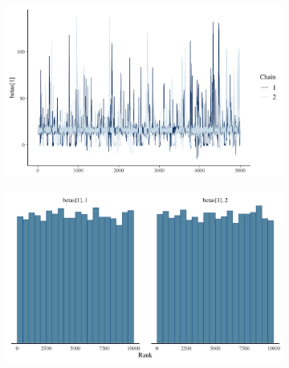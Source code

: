 \documentclass[12pt]{article}
\begin{document}
\begin{figure}[ht]
    \centering
    \begin{subfigure}[b]{0.45\textwidth}
        \centering
        \includegraphics[width=\linewidth]{figures/trace_sas_1.png}
        \label{fig:2a}
    \end{subfigure}
    \hfill
    \begin{subfigure}[b]{0.45\textwidth}
        \centering
        \includegraphics[width=\linewidth]{figures/rank_sas_1.png}
        \label{fig:2b}
    \end{subfigure}


\end{figure}
\end{document}
